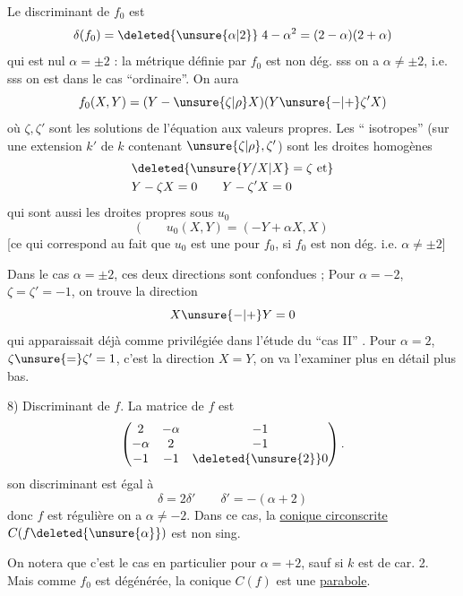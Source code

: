 Le discriminant de $f_0$ est
\[
\delta(f_0)=\deleted{\unsure{\alpha|2}}\;4-\alpha^2=(2-\alpha)(2+\alpha)
\]
qui est nul  $\alpha=\pm2$ : la métrique définie par $f_0$ est non dég. sss on a $\alpha\ne\pm2$, i.e. sss on est dans le cas ``ordinaire''. On aura
\[
f_0(X,Y)=(Y-\unsure{\zeta|\rho}X)(Y\unsure{-|+}\zeta'X)
\]
où $\zeta,\zeta'$ sont les solutions de l'équation aux valeurs propres. Les ``  isotropes''
(sur une extension $k'$ de $k$ contenant $\unsure{\zeta|\rho},\zeta'$) sont les droites homogènes
\[
\begin{aligned}
&\deleted{\unsure{Y/X|X}=\zeta\ \text{et}}\\
&Y-\zeta X=0\qquad Y-\zeta'X=0
\end{aligned}
\]
qui sont aussi les droites propres sous $u_0$
\[
(\qquad u_0(X,Y)=(-Y+\alpha X,X)
\]
[ce qui correspond au fait que $u_0$ est une  \uline{} pour $f_0$, si $f_0$ est non dég. i.e. $\alpha\ne\pm2$]

Dans le cas $\alpha=\pm2$, ces deux directions sont confondues ;  Pour $\alpha=-2$, $\zeta=\zeta'=-1$, on trouve la direction
\[
X\unsure{-|+}Y=0
\]
qui apparaissait déjà comme privilégiée dans l'étude du ``cas II'' . Pour $\alpha=2$, $\zeta\unsure{=}\zeta'=1$, c'est la direction $X=Y$,  on va l'examiner plus en détail plus bas.

8) Discriminant  de $f$. La matrice de $f$ est
\[
\begin{pmatrix}2&-\alpha&-1\\-\alpha&2&-1\\-1&-1&\deleted{\unsure{2}}0\end{pmatrix}.
\]
son discriminant est égal à
\[
\delta=2\delta'\qquad\delta'=-(\alpha+2)
\]
donc $f$ est régulière  on a $\alpha\ne-2$. Dans ce cas, la \uline{conique circonscrite} $C(f\deleted{\unsure{\alpha}})$ est non sing.

On notera que c'est le cas en particulier pour $\alpha=+2$, sauf si $k$ est de car. 2. Mais comme $f_0$ est dégénérée, la conique $C(f)$ est une \uline{parabole}.

